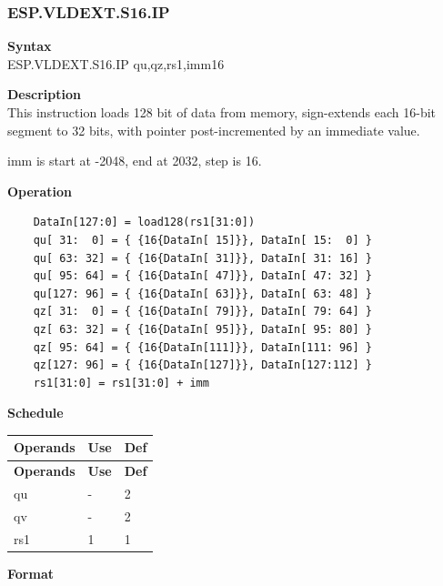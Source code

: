 \newpage
\subsubsection{ESP.VLDEXT.S16.IP}\label{instruction:ESPVLDEXTS16IP}
\textbf{Syntax}\\
ESP.VLDEXT.S16.IP qu,qz,rs1,imm16

\textbf{Description}\\
This instruction loads 128 bit of data from memory, sign-extends each 16-bit segment to 32 bits, with pointer post-incremented by an immediate value.

imm is start at -2048, end at 2032, step is 16.

\textbf{Operation}\\
\begin{lstlisting}
    DataIn[127:0] = load128(rs1[31:0])
    qu[ 31:  0] = { {16{DataIn[ 15]}}, DataIn[ 15:  0] }
    qu[ 63: 32] = { {16{DataIn[ 31]}}, DataIn[ 31: 16] }
    qu[ 95: 64] = { {16{DataIn[ 47]}}, DataIn[ 47: 32] }
    qu[127: 96] = { {16{DataIn[ 63]}}, DataIn[ 63: 48] }
    qz[ 31:  0] = { {16{DataIn[ 79]}}, DataIn[ 79: 64] }
    qz[ 63: 32] = { {16{DataIn[ 95]}}, DataIn[ 95: 80] }
    qz[ 95: 64] = { {16{DataIn[111]}}, DataIn[111: 96] }
    qz[127: 96] = { {16{DataIn[127]}}, DataIn[127:112] }
    rs1[31:0] = rs1[31:0] + imm
\end{lstlisting}

\textbf{Schedule}\\
\begin{longtable}[c]{|l|l|l|}
    \hline
    \rowcolor{lightgray}
    \textbf{Operands} & \textbf{Use} & \textbf{Def} \\\hline
    \endfirsthead
    \hline
    \rowcolor{lightgray}
     \textbf{Operands} & \textbf{Use} & \textbf{Def} \\\hline
    \endhead
    \hline
    \endfoot

  qu & - & 2 \\\hline
  qv & - & 2 \\\hline
  rs1 & 1 & 1

\end{longtable}

\textbf{Format}\\

